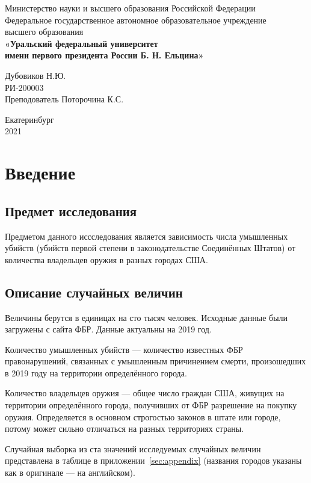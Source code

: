 \documentclass[titlepage]{article}
\begin{document}
\begin{titlepage}

\begin{center}
	Министерство науки и высшего образования Российской Федерации\\
	Федеральное государственное автономное образовательное учреждение\\
	высшего образования\\
	\textbf{«Уральский федеральный университет\\
	имени первого президента России Б. Н. Ельцина»}
\end{center}

\vspace*{9em}{\centering\Huge
	Итоговая рассчётная работа по статистике\par}
\vspace{9em}

\begin{flushright}
	Дубовиков Н.Ю. \\ РИ-200003 \\ Преподователь Поторочина К.С.
\end{flushright}

\mbox{}
\vfill
\begin{center}
	Екатеринбург\\
	2021
\end{center}
\clearpage
\end{titlepage}

\tableofcontents
\newpage

\section{Введение}
\subsection{Предмет исследования}

Предметом данного иссследования является зависимость числа умышленных убийств (убийств первой степени
в законодательстве Соединённых Штатов) от количества владельцев оружия в разных городах США.

\subsection{Описание случайных величин}

Величины берутся в единицах на сто тысяч человек. Исходные данные были загружены с сайта ФБР. Данные актуальны на 2019 год.
\par
Количество умышленных убийств --- количество известных ФБР правонарушений, связанных с умышленным причинением смерти, произошедших
в 2019 году на территории определённого города.
\par
Количество владельцев оружия --- общее число граждан США, живущих на территории определённого города, получивших от ФБР разрешение
на покупку оружия. Определяется в основном строгостью законов в штате или городе, потому может сильно отличаться на разных
территориях страны. \par
Случайная выборка из ста значений исследуемых случайных величин представлена в таблице в приложении~\ref{sec:appendix} (названия городов
указаны как в оригинале --- на английском).
\end{document}
